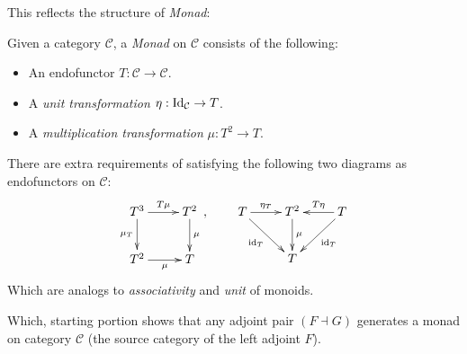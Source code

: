 \documentclass{article}
\begin{document}
This reflects the structure of \emph{Monad}:
\begin{defn}
    Given a category $\mathcal{C}$, a \emph{Monad} on $\mathcal{C}$ consists of the following:
    \begin{itemize}
        \item An endofunctor $T:\mathcal{C}\rightarrow\mathcal{C}$.
        \item A \emph{unit transformation} $\eta:\mathrm{Id}_\mathcal{C}\rightarrow T$.
        \item A \emph{multiplication transformation} $\mu:T^2\rightarrow T$.
    \end{itemize}
    There are extra requirements of satisfying the following two diagrams as endofunctors on $\mathcal{C}$:
    \[\xymatrix{
        T^3 \ar[d]_-{\mu_{T}} \ar[r]^-{T\mu} & T^2\ar[d]^-{\mu}\\
        T^2 \ar[r]_-{\mu} & T
    },\quad\quad \xymatrix{
        T \ar[dr]_-{\id_{T}} \ar[r]^-{\eta_{T}} & T^2 \ar[d]^-{\mu} & T \ar[l]_-{T\eta} \ar[dl]^-{\id_{T}}\\
        & T
    }\]
    Which are analogs to \emph{associativity} and \emph{unit} of monoids.
\end{defn}

Which, starting portion shows that any adjoint pair $(F\dashv G)$ generates a monad on category $\mathcal{C}$ (the source category of the left adjoint $F$).
\end{document}
